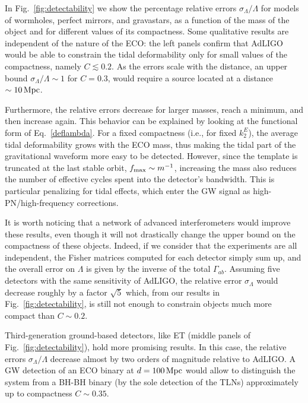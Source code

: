\documentclass[aps,twocolumn,showpacs,preprintnumbers,nofootinbib,prd,superscriptaddress,groupedaddress,10pt]{revtex4-1}
\newcommand{\tn}{\textnormal}
\begin{document}
In Fig.~\ref{fig:detectability} we show the percentage relative errors $\sigma_\Lambda/\Lambda$ for 
models of wormholes, perfect mirrors, and gravastars, as a function of the mass of the object and for different values of its 
compactness. 
%
Some qualitative results are independent of the nature of the ECO: the left panels confirm that AdLIGO would be able to constrain 
the tidal deformability only for small values of the compactness, namely ${C}\lesssim 0.2$. As the errors 
scale with the distance, an upper bound $\sigma_\Lambda/\Lambda\sim 1$ for ${C}=0.3$,
would require a source located at a distance $\sim 10\,{\rm Mpc}$. 
%

Furthermore, the relative errors decrease for 
larger masses, reach a minimum, and then increase again. This behavior can be explained by looking at the 
functional form of Eq.~\eqref{deflambda}. For a fixed compactness (i.e., for fixed $k_2^E$), the average tidal deformability grows  
with the ECO mass, thus making the tidal part of the gravitational waveform more easy to be detected. However, 
since the template is truncated at the last stable orbit, $f_\tn{max}\sim m^{-1}$, increasing the mass also reduces 
the number of effective cycles spent into the detector's bandwidth. This is particular penalizing for tidal effects, which 
enter the GW signal as high-PN/high-frequency corrections. 

It is worth noticing that a network of advanced interferometers would 
improve these results, even though it will not drastically change the upper bound on the compactness of these objects.
Indeed, if we consider that the experiments are all independent, the Fisher matrices computed for each detector 
simply sum up, and the overall error on $\Lambda$ is given by the inverse of the total $\Gamma_{ab}$.
Assuming five detectors with the same sensitivity of AdLIGO, the relative error $\sigma_\Lambda$ would decrease roughly by a factor $\sqrt{5}$ which, from our results in Fig.~\ref{fig:detectability}, is still not enough to constrain objects much more compact than ${C}\sim0.2$.


Third-generation ground-based detectors, like ET (middle panels of Fig.~\ref{fig:detectability}), hold more promising results. In this case, the relative errors $\sigma_\Lambda/\Lambda$ decrease almost by two orders of magnitude relative to AdLIGO. A GW detection of an ECO binary at $d=100\,{\rm Mpc}$ 
would allow to distinguish the system from a BH-BH binary (by the sole detection of the TLNs) approximately up to compactness ${C}\sim0.35$.
 
\end{document}
